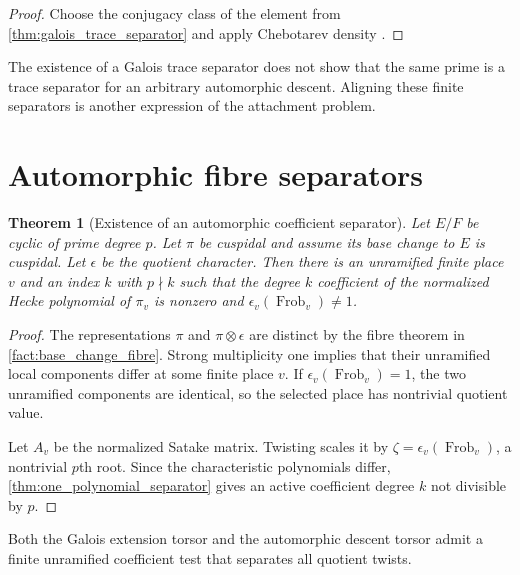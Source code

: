 \documentclass{aomart}
\newtheorem{theorem}{Theorem}[section]
\theoremstyle{definition}
\theoremstyle{remark}
\newcommand{\Frob}{\operatorname{Frob}}
\begin{document}
\begin{proof}
Choose the conjugacy class of the element from \cref{thm:galois_trace_separator} and apply Chebotarev density \cite{Neukirch1999}.
\end{proof}

\begin{remark}\label{rem:separator_mismatch}
The existence of a Galois trace separator does not show that the same prime is a trace separator for an arbitrary automorphic descent. Aligning these finite separators is another expression of the attachment problem.
\end{remark}

\section{Automorphic fibre separators}\label{sec:automorphic_separator}

\begin{theorem}[Existence of an automorphic coefficient separator]\label{thm:automorphic_separator}
Let \(E/F\) be cyclic of prime degree \(p\). Let \(\pi\) be cuspidal and assume its base change to \(E\) is cuspidal. Let \(\epsilon\) be the quotient character. Then there is an unramified finite place \(v\) and an index \(k\) with \(p\nmid k\) such that the degree \(k\) coefficient of the normalized Hecke polynomial of \(\pi_v\) is nonzero and \(\epsilon_v(\Frob_v)\neq1\).
\end{theorem}

\begin{proof}
The representations \(\pi\) and \(\pi\otimes\epsilon\) are distinct by the fibre theorem in \cref{fact:base_change_fibre}. Strong multiplicity one implies that their unramified local components differ at some finite place \(v\). If \(\epsilon_v(\Frob_v)=1\), the two unramified components are identical, so the selected place has nontrivial quotient value.

Let \(A_v\) be the normalized Satake matrix. Twisting scales it by \(\zeta=\epsilon_v(\Frob_v)\), a nontrivial \(p\)th root. Since the characteristic polynomials differ, \cref{thm:one_polynomial_separator} gives an active coefficient degree \(k\) not divisible by \(p\).
\end{proof}

\begin{corollary}\label{cor:both_torsor_separators}
Both the Galois extension torsor and the automorphic descent torsor admit a finite unramified coefficient test that separates all quotient twists.
\end{corollary}
\end{document}
